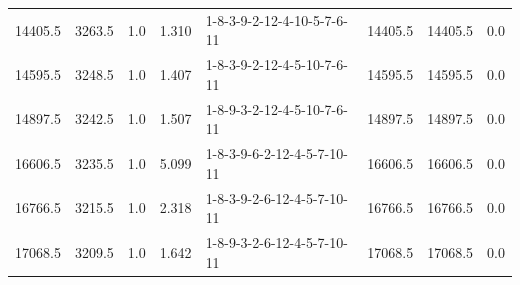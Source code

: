 \begin{tabular}{rrrrlrrr}
 14405.5 &  3263.5 &            1.0 &              1.310 &  1-8-3-9-2-12-4-10-5-7-6-11 &       14405.5 &         14405.5 &       0.0 \\
 14595.5 &  3248.5 &            1.0 &              1.407 &  1-8-3-9-2-12-4-5-10-7-6-11 &       14595.5 &         14595.5 &       0.0 \\
 14897.5 &  3242.5 &            1.0 &              1.507 &  1-8-9-3-2-12-4-5-10-7-6-11 &       14897.5 &         14897.5 &       0.0 \\
 16606.5 &  3235.5 &            1.0 &              5.099 &  1-8-3-9-6-2-12-4-5-7-10-11 &       16606.5 &         16606.5 &       0.0 \\
 16766.5 &  3215.5 &            1.0 &              2.318 &  1-8-3-9-2-6-12-4-5-7-10-11 &       16766.5 &         16766.5 &       0.0 \\
 17068.5 &  3209.5 &            1.0 &              1.642 &  1-8-9-3-2-6-12-4-5-7-10-11 &       17068.5 &         17068.5 &       0.0 \\
\bottomrule
\end{tabular}
